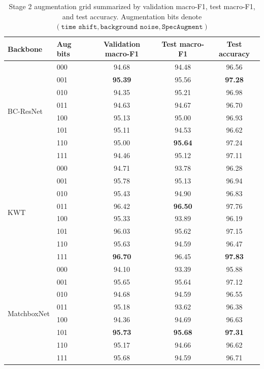 \documentclass[11pt]{article}
\begin{document}
\begin{table}[b!]
\centering
\caption{Stage 2 augmentation grid summarized by validation macro-F1, test macro-F1, and test accuracy. Augmentation bits denote \((\texttt{time shift}, \texttt{background noise}, \texttt{SpecAugment})\)}
\label{tab:stage2-results}
\smallskip
\small
\begin{tabular}{@{}llccc@{}}
\toprule
\textbf{Backbone} & \textbf{Aug bits} & \textbf{Validation macro-F1} & \textbf{Test macro-F1} & \textbf{Test accuracy}\\
\midrule
\multirow{8}{*}{BC-ResNet}
 & 000 & 94.68 & 94.48 & 96.56 \\
 & 001 & \textbf{95.39} & 95.56 & \textbf{97.28} \\
 & 010 & 94.35 & 95.21 & 96.98 \\
 & 011 & 94.63 & 94.67 & 96.70 \\
 & 100 & 95.13 & 95.00 & 96.93 \\
 & 101 & 95.11 & 94.53 & 96.62 \\
 & 110 & 95.00 & \textbf{95.64} & 97.24 \\
 & 111 & 94.46 & 95.12 & 97.11 \\
\midrule
\multirow{8}{*}{KWT}
 & 000 & 94.71 & 93.78 & 96.28 \\
 & 001 & 95.78 & 95.13 & 96.94 \\
 & 010 & 95.43 & 94.90 & 96.83 \\
 & 011 & 96.42 & \textbf{96.50} & 97.76 \\
 & 100 & 95.33 & 93.89 & 96.19 \\
 & 101 & 96.03 & 95.62 & 97.15 \\
 & 110 & 95.63 & 94.59 & 96.47 \\
 & 111 & \textbf{96.70} & 96.45 & \textbf{97.83} \\

\midrule
\multirow{8}{*}{MatchboxNet}
 & 000 & 94.10 & 93.39 & 95.88 \\
 & 001 & 95.65 & 95.64 & 97.12 \\
 & 010 & 94.68 & 94.59 & 96.55 \\
 & 011 & 95.18 & 93.62 & 96.38 \\
 & 100 & 94.36 & 94.69 & 96.63 \\
 & 101 & \textbf{95.73} & \textbf{95.68} & \textbf{97.31} \\
 & 110 & 95.17 & 94.66 & 96.62 \\
 & 111 & 95.68 & 94.59 & 96.71 \\
\bottomrule
\end{tabular}
\end{table}
\end{document}
